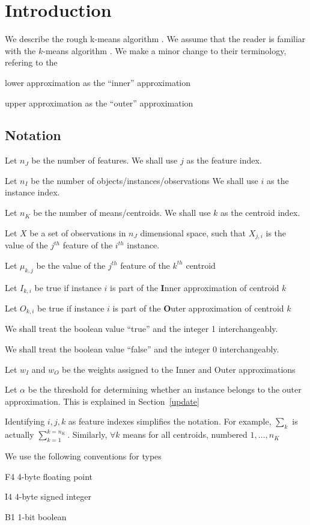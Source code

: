 
\section{Introduction}

We describe the rough k-means algorithm \cite{Peters2012}. 
We assume that the reader is familiar with the \(k\)-means algorithm
\cite{Hastie2009}. We make a minor change to their terminology, 
refering to the 
\bi
\item lower approximation as the ``inner'' approximation
\item upper approximation as the ``outer'' approximation
\ei

\subsection{Notation}

\be
\item Let \(n_J\) be the number of features. 
We shall use \(j\) as the feature index. 
\item Let \(n_I\) be the number of objects/instances/observations
We shall use \(i\) as the instance index. 
\item Let \(n_K\) be the number of means/centroids.
We shall use \(k\) as the centroid index. 
\item Let \(X\) be a set of observations in \(n_J\) dimensional space, 
such that \(X_{j, i}\) is the value of the \(j^{th}\) feature of 
the \(i^{th}\) instance. 
\item Let \(\mu_{k, j}\) be the value of the \(j^{th}\) feature of the \(k^{th}\)
centroid
\item Let \(I_{k, i}\) be true if instance \(i\) is part of the 
{\bf I}nner approximation of centroid \(k\)
\item Let \(O_{k, i}\) be true if instance \(i\) is part of the 
{\bf O}uter approximation of centroid \(k\)
\item We shall treat the boolean value ``true'' and the integer
1 interchangeably. 
\item We shall treat the boolean value ``false'' and the integer
0 interchangeably. 
\item Let \(w_I\) and \(w_O\) be the weights assigned to the Inner and Outer
approximations
\item Let \(\alpha\) be the threshold for determining whether an instance
belongs to the outer approximation. This is explained in 
Section~\ref{update}
\item Identifying \(i, j, k\) as feature indexes simplifies the notation. For
example, \(\sum_k\) is actually \(\sum_{k=1}^{k=n_K}\). Similarly, \(\forall k\)
means for all centroids, numbered \(1, \ldots, n_K\)
\item We use the following conventions for types
\bd 
\item F4 4-byte floating point
\item I4 4-byte signed integer
\item B1 1-bit boolean
\ed
\ee

